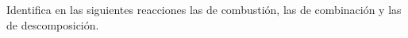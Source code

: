 Identifica en las siguientes reacciones las de combustión, las de combinación
y las de descomposición.

\begin{multicols}{2}
    \begin{parts}
        \part 
        \part 
        \part 
        \part 
        \part 
        \part 
        \part 
        \part 
        \part 
        \part 
        \part 
        \part 

\end{parts}
\end{multicols}

